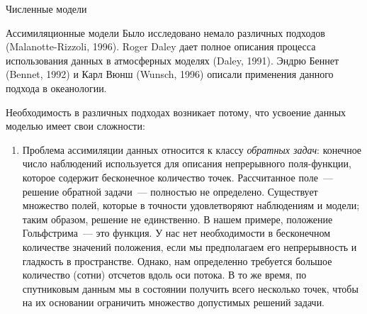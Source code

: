 \begin{chapter}{Численные модели}
\begin{section}{Ассимиляционные модели}
Было исследовано немало различных подходов (Malanotte-Rizzoli, 1996). 
Roger Daley дает полное описания процесса использования
данных в атмосферных моделях (Daley, 1991). 
Эндрю Беннет (Bennet, 1992) и Карл Вюнш (Wunsch, 1996) описали применения 
данного подхода в океанологии. 
%

Необходимость в различных подходах возникает потому, что усвоение данных%
 моделью имеет свои сложности:
%
\begin{enumerate}
\item
Проблема ассимиляции данных относится к классу
\emph{обратных задач}: конечное число наблюдений
используется для описания непрерывного поля-функции, которое содержит
бесконечное количество точек. Рассчитанное поле~--- решение обратной
задачи~--- полностью не определено. Существует множество полей, которые
в точности удовлетворяют наблюдениям и модели; таким образом, решение не
единственно. В нашем примере, положение 
Гольфстрима~--- это
функция. У нас нет необходимости в бесконечном количестве значений
положения, если мы предполагаем его непрерывность и гладкость в
пространстве. Однако, нам определенно требуется большое количество (сотни) 
отсчетов вдоль оси потока. В то же время, по спутниковым данным мы в состоянии
получить всего несколько точек, чтобы на их основании ограничить множество
допустимых решений задачи. 
%


\end{enumerate}
\end{section}
\end{chapter}
